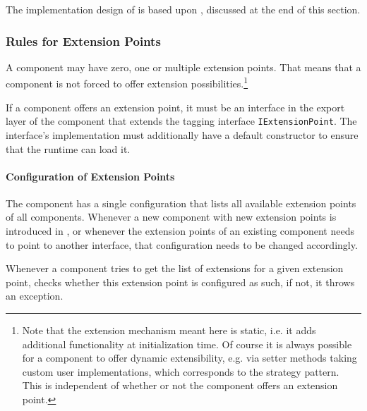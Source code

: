 The implementation design of \COMPextensionManagement{} is based upon , discussed at the end of this section.


\subsubsection{Rules for Extension Points}
\label{sec:RulesforExtensionPoints}

A \LibName{} component may have zero, one or multiple extension points. That means that a \LibName{} component is not forced to offer extension possibilities.\footnote{Note that the extension mechanism meant here is static, i.e. it adds additional functionality at initialization time. Of course it is always possible for a component to offer dynamic extensibility, e.g. via setter methods taking custom user implementations, which corresponds to the strategy pattern. This is independent of whether or not the component offers an extension point.}

If a component offers an extension point, it must be an interface in the export layer of the component that extends the tagging interface \texttt{IExtensionPoint}. The interface's implementation must additionally have a default constructor to ensure that the runtime can load it.


\paragraph{Configuration of Extension Points}
\label{sec:ConfigurationforExtensionPoints}

The \COMPextensionManagement{} component has a single configuration that lists all available extension points of all \LibName{} components. Whenever a new component with new extension points is introduced in \LibName{}, or whenever the extension points of an existing component needs to point to another interface, that configuration needs to be changed accordingly.

Whenever a component tries to get the list of extensions for a given extension point, \COMPextensionManagement{} checks whether this extension point is configured as such, if not, it throws an exception.


